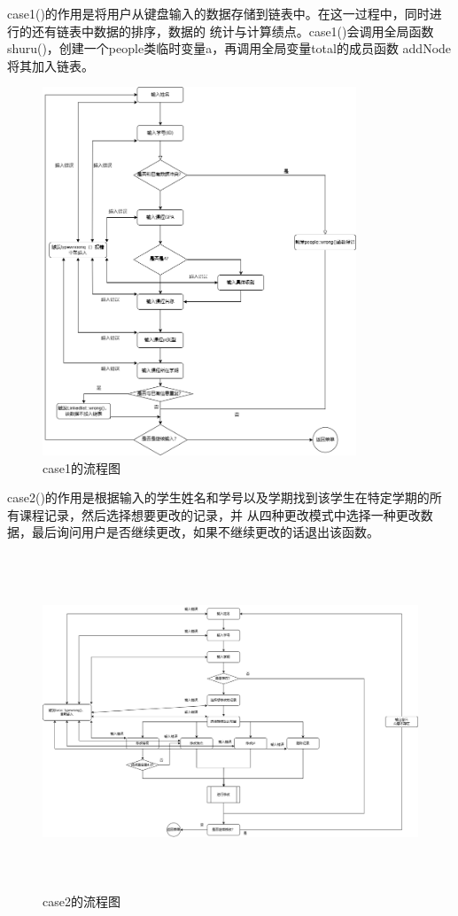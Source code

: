 \documentclass[fontset=windows]{article}
\begin{document}
case1()的作用是将用户从键盘输入的数据存储到链表中。在这一过程中，同时进行的还有链表中数据的排序，数据的
统计与计算绩点。case1()会调用全局函数shuru()，创建一个people类临时变量a，再调用全局变量total的成员函数
addNode将其加入链表。

\vspace{0.5cm}
\begin{figure}[h]
	\begin{center}
		\includegraphics[height = 11cm]{case1.png}
		\vspace{1cm}
		\caption{case1的流程图}
	\end{center}
\end{figure}

case2()的作用是根据输入的学生姓名和学号以及学期找到该学生在特定学期的所有课程记录，然后选择想要更改的记录，并
从四种更改模式中选择一种更改数据，最后询问用户是否继续更改，如果不继续更改的话退出该函数。
\newpage

\begin{figure}[h]
	\begin{center}
		\vspace{-2cm}
		\includegraphics[height = 10cm]{case2.png}
		\vspace{1cm}
		\caption{case2的流程图}
	\end{center}
\end{figure}
\end{document}
